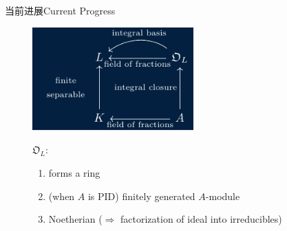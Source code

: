 \documentclass[aspectratio=169]{beamer}
\begin{document}
    \begin{frame}{当前进展}{Current Progress}
        \begin{figure}[htpb]
        \centering
        \begin{minipage}{0.49\linewidth}
        \includegraphics[width=6.2cm]{dia5.pdf}
        \end{minipage}
        \hfill
        \begin{minipage}{0.49\linewidth}
        $\mathfrak{O}_L$:
        \begin{enumerate}
        \item forms a ring
        \item (when $A$ is PID) finitely generated $A$-module
        \item \textcolor{rgb,255:red,214;green,214;blue,92}{Noetherian ($\Rightarrow$ factorization of ideal into irreducibles)}
        \end{enumerate}
        \end{minipage}
        \end{figure}
    \end{frame}
    
\end{document}
